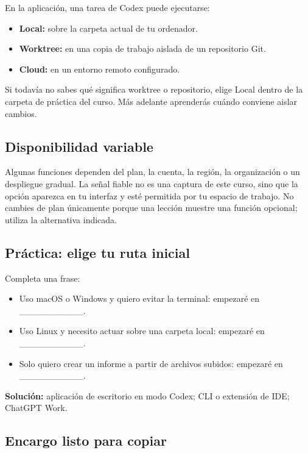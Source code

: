 \documentclass[10pt,a4paper,openany]{book}
\providecommand{\tightlist}{\setlength{\itemsep}{0.18em}\setlength{\parskip}{0pt}}
\begin{document}
En la aplicación, una tarea de Codex puede ejecutarse:

\begin{itemize}
\tightlist
\item
  \textbf{Local:} sobre la carpeta actual de tu ordenador.
\item
  \textbf{Worktree:} en una copia de trabajo aislada de un repositorio
  Git.
\item
  \textbf{Cloud:} en un entorno remoto configurado.
\end{itemize}

Si todavía no sabes qué significa worktree o repositorio, elige Local
dentro de la carpeta de práctica del curso. Más adelante aprenderás
cuándo conviene aislar cambios.

\subsection{Disponibilidad variable}\label{disponibilidad-variable}

Algunas funciones dependen del plan, la cuenta, la región, la
organización o un despliegue gradual. La señal fiable no es una captura
de este curso, sino que la opción aparezca en tu interfaz y esté
permitida por tu espacio de trabajo. No cambies de plan únicamente
porque una lección muestre una función opcional; utiliza la alternativa
indicada.

\subsection{Práctica: elige tu ruta
inicial}\label{pruxe1ctica-elige-tu-ruta-inicial}

Completa una frase:

\begin{itemize}
\tightlist
\item
  Uso macOS o Windows y quiero evitar la terminal: empezaré en
  \_\_\_\_\_\_\_\_\_\_.
\item
  Uso Linux y necesito actuar sobre una carpeta local: empezaré en
  \_\_\_\_\_\_\_\_\_\_.
\item
  Solo quiero crear un informe a partir de archivos subidos: empezaré en
  \_\_\_\_\_\_\_\_\_\_.
\end{itemize}

\textbf{Solución:} aplicación de escritorio en modo Codex; CLI o
extensión de IDE; ChatGPT Work.

\subsection{Encargo listo para
copiar}\label{encargo-listo-para-copiar-1}
\end{document}
